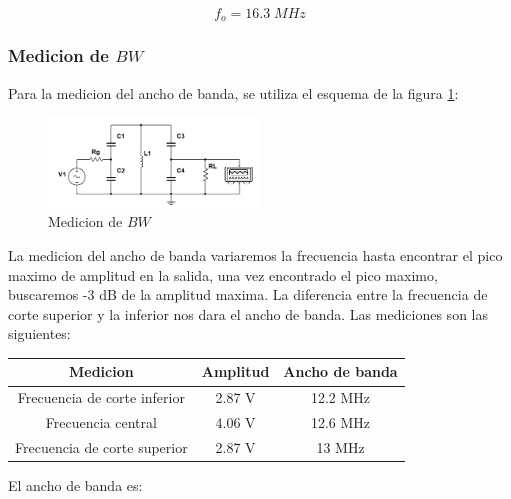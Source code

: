\begin{equation}
    \boxed{f_o = 16.3\; MHz}
\end{equation}

\subsubsection{Medicion de $BW$}

Para la medicion del ancho de banda, se utiliza el esquema de la figura \ref{fig: de la medicion del ancho de banda}:

\begin{figure}[h]
    \centering
    \includegraphics[width=0.5\textwidth]{Imagenes/medicion_bw.png}
    \caption{Medicion de $BW$}
    \label{fig: de la medicion del ancho de banda}
\end{figure}

La medicion del ancho de banda variaremos la frecuencia hasta encontrar el pico maximo de amplitud en la salida, una vez encontrado
el pico maximo, buscaremos -3 dB de la amplitud maxima. La diferencia entre la frecuencia de corte superior y la inferior nos dara el ancho de banda. 
Las mediciones son las siguientes:

\begin{table}[h]
    \centering
    \begin{tabular}{|c|c|c|}
    \hline
    \rowcolor[HTML]{C0C0C0} 
    \textbf{Medicion} & \textbf{Amplitud} & \textbf{Ancho de banda} \\ \hline
    Frecuencia de corte inferior            & 2.87 V             & 12.2 MHz                \\ \hline
    Frecuencia central         & 4.06 V             & 12.6 MHz                \\ \hline
    Frecuencia de corte superior            & 2.87 V             & 13 MHz                \\ \hline
    \end{tabular}
\end{table}

El ancho de banda es:

